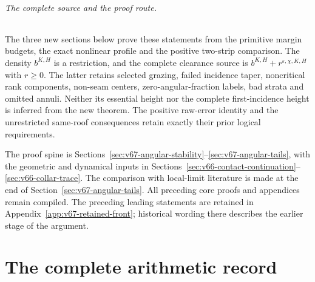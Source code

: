 \documentclass[11pt,reqno]{amsart}
\numberwithin{equation}{section}
\theoremstyle{definition}\newtheorem{definition}[theorem]{Definition}
\theoremstyle{remark}\newtheorem{remark}[theorem]{Remark}
\begin{document}
\paragraph{The complete source and the proof route.}
The three new sections below prove these statements from the primitive
margin budgets, the exact nonlinear profile and the positive two-strip
comparison. The density $b^{K,H}$ is a restriction, and the complete
clearance source is $b^{K,H}+r^{\varepsilon,\chi,K,H}$ with $r\ge0$.
The latter retains selected grazing, failed incidence taper, noncritical
rank components, non-seam centers, zero-angular-fraction labels, bad
strata and omitted annuli. Neither its essential height nor the complete
first-incidence height is inferred from the new theorem. The positive
raw-error identity and the unrestricted same-roof consequences retain
exactly their prior logical requirements.

The proof spine is Sections~\ref{sec:v67-angular-stability}--\ref{sec:v67-angular-tails},
with the geometric and dynamical inputs in
Sections~\ref{sec:v66-contact-continuation}--\ref{sec:v66-collar-trace}.
The comparison with local-limit literature is made at the end of
Section~\ref{sec:v67-angular-tails}. All preceding core proofs and
appendices remain compiled. The preceding leading statements are
retained in Appendix~\ref{app:v67-retained-front}; historical wording
there describes the earlier stage of the argument.

\part{The complete arithmetic record}


























\end{document}
